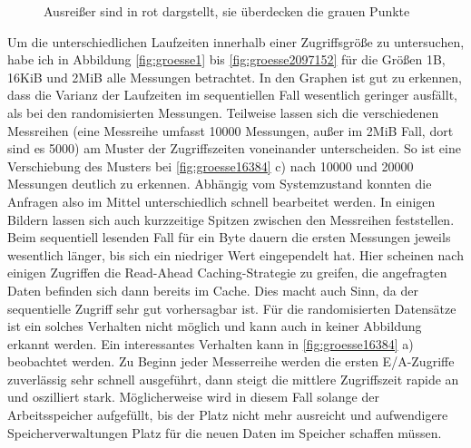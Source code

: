 \documentclass[
	12pt,
	a4paper,
	BCOR10mm,
	DIV14,
	listof=totoc,
	bibliography=totoc,
	headsepline
]{scrreprt}
\begin{document}
\begin{figure}
	\hfill
	\caption{Ausreißer sind in rot dargstellt, sie überdecken die grauen Punkte}
	\label{fig:ausreisser}
\end{figure} 

Um die unterschiedlichen Laufzeiten innerhalb einer Zugriffsgröße zu untersuchen, habe ich in Abbildung \ref{fig:groesse1} bis \ref{fig:groesse2097152} für die Größen 1B, 16KiB und 2MiB alle Messungen betrachtet.
In den Graphen ist gut zu erkennen, dass die Varianz der Laufzeiten im sequentiellen Fall wesentlich geringer ausfällt, als bei den randomisierten Messungen.
Teilweise lassen sich die verschiedenen Messreihen (eine Messreihe umfasst 10000 Messungen, außer im 2MiB Fall, dort sind es 5000) am Muster der Zugriffszeiten voneinander unterscheiden.
So ist eine Verschiebung des Musters bei \ref{fig:groesse16384} c) nach 10000 und 20000 Messungen deutlich zu erkennen.
Abhängig vom Systemzustand konnten die Anfragen also im Mittel unterschiedlich schnell bearbeitet werden.
In einigen Bildern lassen sich auch kurzzeitige Spitzen zwischen den Messreihen feststellen.
Beim sequentiell lesenden Fall für ein Byte dauern die ersten Messungen jeweils wesentlich länger, bis sich ein niedriger Wert eingependelt hat. Hier scheinen nach einigen Zugriffen die Read-Ahead Caching-Strategie zu greifen, die angefragten Daten befinden sich dann bereits im Cache. Dies macht auch Sinn, da der sequentielle Zugriff sehr gut vorhersagbar ist.
Für die randomisierten Datensätze ist ein solches Verhalten nicht möglich und kann auch in keiner Abbildung erkannt werden.
Ein interessantes Verhalten kann in \ref{fig:groesse16384} a) beobachtet werden.
Zu Beginn jeder Messerreihe werden die ersten E/A-Zugriffe zuverlässig sehr schnell ausgeführt, dann steigt die mittlere Zugriffszeit rapide an und oszilliert stark.
Möglicherweise wird in diesem Fall solange der Arbeitsspeicher aufgefüllt, bis der Platz nicht mehr ausreicht und aufwendigere Speicherverwaltungen Platz für die neuen Daten im Speicher schaffen müssen.
\end{document}
